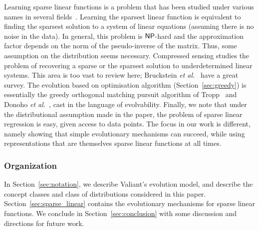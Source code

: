 
Learning sparse linear functions is a problem that has been studied under
various names in several fields~. Learning
the sparsest linear function is equivalent to finding the sparsest solution to a
system of linear equations (assuming there is no noise in the data). In general,
this problem is $\mathsf{NP}$-hard and the approximation factor depends on the norm of
the pseudo-inverse of the matrix\cite{Natarjan:1995}. Thus, some assumption on
the distribution seems necessary. Compressed sensing studies the problem of
recovering a sparse or the sparsest solution to underdetermined linear systems.
This area is too vast to review here; Bruckstein \emph{et
al.}~\cite{Donoho:2009-sparse} have a great survey. The evolution based on
optimisation algorithm (Section~\ref{sec:greedy}) is essentially the greedy
orthogonal matching pursuit algorithm of Tropp~\cite{Tropp:2004-greed} and
Donoho \emph{et al.}~\cite{Donoho:2006-recovery}, cast in the language of
evolvability. Finally, we note that under the distributional assumption made in
the paper, the problem of sparse linear regression is easy, given access to data
points. The focus in our work is different, namely showing that simple
evolutionary mechanisms can succeed, while using representations that are
themselves sparse linear functions at all times.

\subsubsection*{Organization}

In Section~\ref{sec:notation}, we describe Valiant's evolution model, and describe
the concept classes and class of distributions considered in this paper.
Section~\ref{sec:sparse_linear} contains the evolutionary mechanisms for sparse
linear functions. We conclude in Section~\ref{sec:conclusion} with some
discussion and directions for future work.
